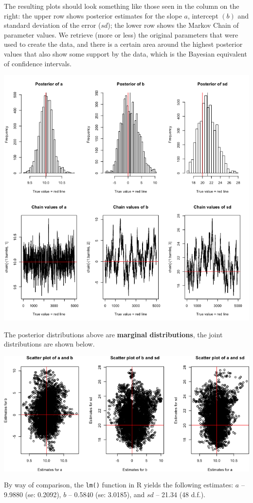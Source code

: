 \begin{Example}
\begin{lstlisting}
\end{lstlisting}
The resulting plots should look something like those seen in the column on the right: the upper row shows posterior estimates for the slope $a$, intercept $(b)$ and standard deviation of the error ($sd$); the lower row shows the Markov Chain of parameter values. We retrieve (more or less) the original parameters that were used to create the data, and there is a certain area around the highest posterior values that also show some support by the data, which is the Bayesian equivalent of confidence intervals.\newpage\noindent
\begin{center}
		\includegraphics[width=0.9\linewidth]{Images/example9c.png}
\end{center}
The posterior distributions above are \textbf{marginal distributions}, the joint distributions are shown below. 
\begin{center}
		\includegraphics[width=0.9\linewidth]{Images/example9d.png}
\end{center}
By way of comparison, the \texttt{lm()} function in R yields the following estimates: $a$ -- 9.9880 (se: 0.2092), $b$ -- 0.5840 (se: 3.0185), and $sd$ -- 21.34 (48 d.f.).
\end{Example}

